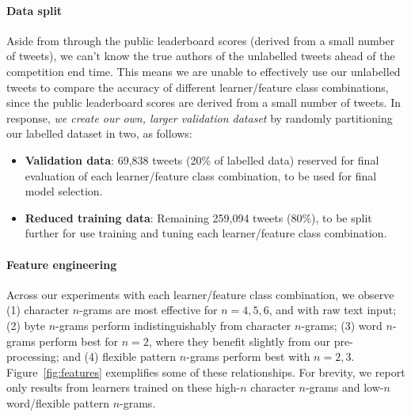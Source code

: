 \documentclass[twocolumn,10pt]{article}
\begin{document}
\paragraph{Data split}

Aside from through the public leaderboard scores (derived from a
small number of tweets), we can't know the true authors of the
unlabelled tweets ahead of the competition end time. This means we
are unable to effectively use our unlabelled tweets to compare
the accuracy of different learner/feature class combinations,
since the public leaderboard scores are derived from a small
number of tweets.
In response, \emph{we create our own, larger validation dataset}
by randomly partitioning our labelled dataset in two, as follows:

\begin{itemize}[itemsep=0pt,topsep=0pt]
    \item \textbf{Validation data}: 69,838 tweets (20\% of labelled data)
    reserved for final evaluation of each learner/feature class combination,
    to be used for final model selection.
    \item \textbf{Reduced training data}: Remaining 259,094 tweets (80\%),
    to be split further for use training and tuning each learner/feature
    class combination.
\end{itemize}


\paragraph{Feature engineering}

Across our experiments with each learner/feature class combination,
we observe
(1) character $n$-grams are most effective for $n=4,5,6$, and with raw
    text input;
(2) byte $n$-grams perform indistinguishably from character $n$-grams;
(3) word $n$-grams perform best for $n=2$, where they benefit slightly
    from our pre-processing; and
(4) flexible pattern $n$-grams perform best with $n=2,3$.
Figure~\ref{fig:features} exemplifies some of these relationships.
For brevity, we report only results from learners trained on these
high-$n$ character $n$-grams and low-$n$ word/flexible pattern $n$-grams.
\end{document}
